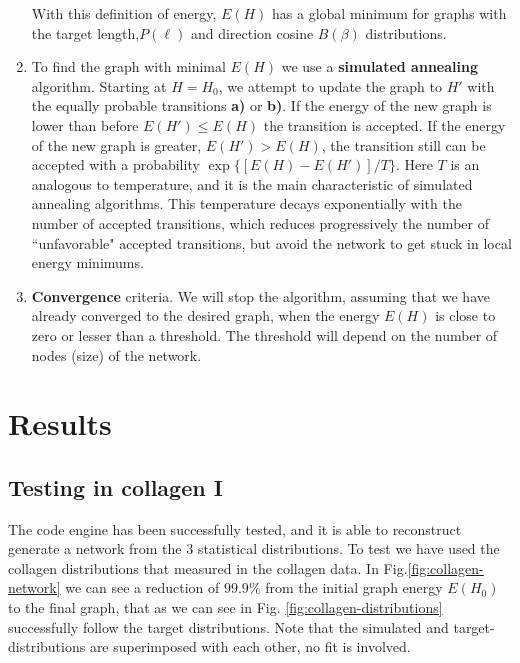 \begin{enumerate}[label=\textbf{\Roman*}]
  With this definition of energy, $E(H)$ has a global minimum for graphs with
  the target length,$P(\ell)$ and direction cosine $B(\beta)$ distributions.
  
  \item To find the graph with minimal $E(H)$ we use a \textbf{simulated
  annealing} algorithm. Starting at $H=H_0$, we attempt to update the graph to
  $H'$ with the equally probable transitions \textbf{a)} or \textbf{b)}.  If the
  energy of the new graph is lower than before $E(H')\leq E(H)$ the transition
  is accepted. If the energy of the new graph is greater, $E(H')> E(H)$, the
  transition still can be accepted with a probability $\exp\{[E(H)-E(H')]/T\}$. Here $T$ is an analogous to temperature, and it is
  the main characteristic of simulated annealing algorithms. This temperature
  decays exponentially with the number of accepted transitions, which reduces
  progressively the number of ``unfavorable" accepted transitions, but avoid the
  network to get stuck in local energy minimums.
  \item \textbf{Convergence} criteria. We will stop the algorithm, assuming
  that we have already converged to the desired graph, when the energy $E(H)$ is
  close to zero or lesser than a threshold.
  The threshold will depend on the number of nodes (size) of the network.
\end{enumerate} 

\section{Results}
\subsection{Testing in collagen I}
The code engine has been successfully tested, and it is able to reconstruct
generate a network from the $3$ statistical distributions. To test we have used
the collagen distributions that \citet{lindstrom_biopolymer_2010} measured in
the collagen data. In Fig.\ref{fig:collagen-network} we
can see a reduction of $99.9\%$ from the initial graph energy $E(H_0)$ to the
final graph, that as we can see in Fig.
\ref{fig:collagen-distributions} successfully follow the target distributions. 
Note that the
simulated and target-distributions are superimposed with each other, no fit is involved. 


